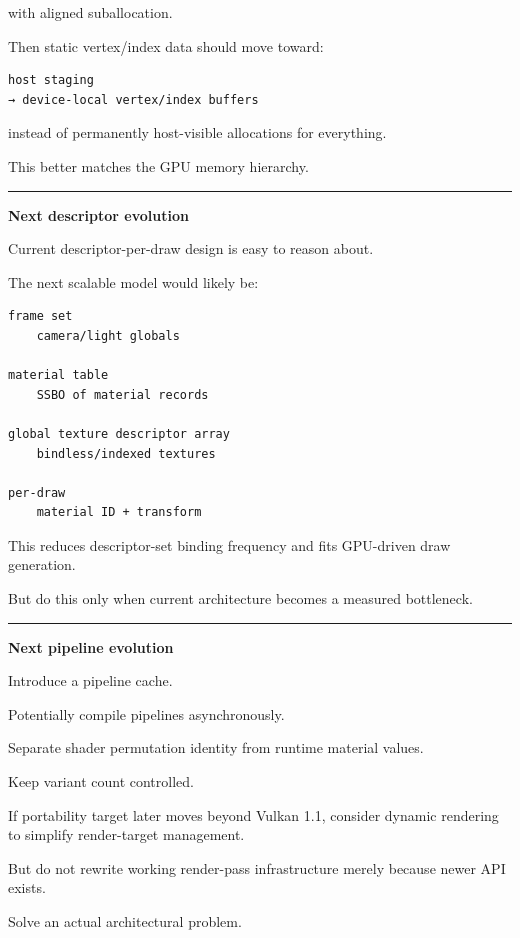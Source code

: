 with aligned suballocation.

Then static vertex/index data should move toward:

\begin{verbatim}
host staging
→ device-local vertex/index buffers
\end{verbatim}

instead of permanently host-visible allocations for everything.

This better matches the GPU memory hierarchy.

\begin{center}\rule{0.5\linewidth}{0.5pt}\end{center}

\textbf{Next descriptor evolution}

Current descriptor-per-draw design is easy to reason about.

The next scalable model would likely be:

\begin{verbatim}
frame set
    camera/light globals

material table
    SSBO of material records

global texture descriptor array
    bindless/indexed textures

per-draw
    material ID + transform
\end{verbatim}

This reduces descriptor-set binding frequency and fits GPU-driven draw generation.

But do this only when current architecture becomes a measured bottleneck.

\begin{center}\rule{0.5\linewidth}{0.5pt}\end{center}

\textbf{Next pipeline evolution}

Introduce a pipeline cache.

Potentially compile pipelines asynchronously.

Separate shader permutation identity from runtime material values.

Keep variant count controlled.

If portability target later moves beyond Vulkan 1.1, consider dynamic rendering to simplify render-target management.

But do not rewrite working render-pass infrastructure merely because newer API exists.

Solve an actual architectural problem.

